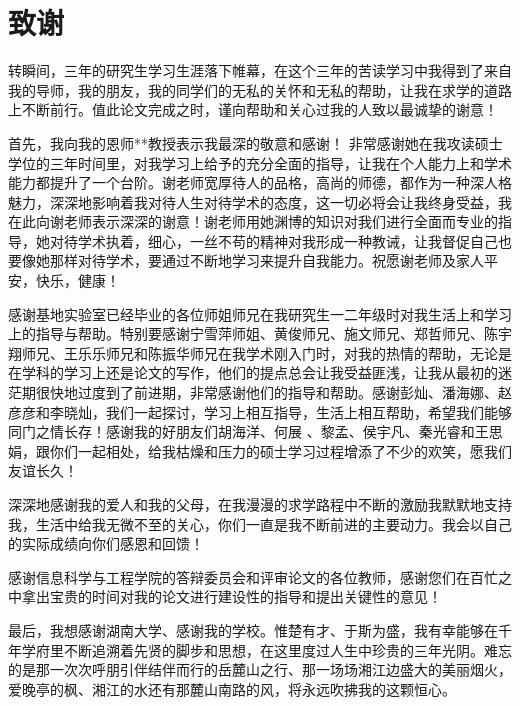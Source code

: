 \chapter*{致\quad 谢}
转瞬间，三年的研究生学习生涯落下帷幕，在这个三年的苦读学习中我得到了来自我的导师，我的朋友，我的同学们的无私的关怀和无私的帮助，让我在求学的道路上不断前行。值此论文完成之时，谨向帮助和关心过我的人致以最诚挚的谢意！

首先，我向我的恩师**教授表示我最深的敬意和感谢！
非常感谢她在我攻读硕士学位的三年时间里，对我学习上给予的充分全面的指导，让我在个人能力上和学术能力都提升了一个台阶。谢老师宽厚待人的品格，高尚的师德，都作为一种深人格魅力，深深地影响着我对待人生对待学术的态度，这一切必将会让我终身受益，我在此向谢老师表示深深的谢意！谢老师用她渊博的知识对我们进行全面而专业的指导，她对待学术执着，细心，一丝不苟的精神对我形成一种教诫，让我督促自己也要像她那样对待学术，要通过不断地学习来提升自我能力。祝愿谢老师及家人平安，快乐，健康！

感谢基地实验室已经毕业的各位师姐师兄在我研究生一二年级时对我生活上和学习上的指导与帮助。特别要感谢宁雪萍师姐、黄俊师兄、施文师兄、郑哲师兄、陈宇翔师兄、王乐乐师兄和陈振华师兄在我学术刚入门时，对我的热情的帮助，无论是在学科的学习上还是论文的写作，他们的提点总会让我受益匪浅，让我从最初的迷茫期很快地过度到了前进期，非常感谢他们的指导和帮助。感谢彭灿、潘海娜、赵彦彦和李晓灿，我们一起探讨，学习上相互指导，生活上相互帮助，希望我们能够同门之情长存！感谢我的好朋友们胡海洋、何展 、黎孟、侯宇凡、秦光睿和王思娟，跟你们一起相处，给我枯燥和压力的硕士学习过程增添了不少的欢笑，愿我们友谊长久！

深深地感谢我的爱人和我的父母，在我漫漫的求学路程中不断的激励我默默地支持我，生活中给我无微不至的关心，你们一直是我不断前进的主要动力。我会以自己的实际成绩向你们感恩和回馈！

感谢信息科学与工程学院的答辩委员会和评审论文的各位教师，感谢您们在百忙之中拿出宝贵的时间对我的论文进行建设性的指导和提出关键性的意见！

最后，我想感谢湖南大学、感谢我的学校。惟楚有才、于斯为盛，我有幸能够在千年学府里不断追溯着先贤的脚步和思想，在这里度过人生中珍贵的三年光阴。难忘的是那一次次呼朋引伴结伴而行的岳麓山之行、那一场场湘江边盛大的美丽烟火，爱晚亭的枫、湘江的水还有那麓山南路的风，将永远吹拂我的这颗恒心。








